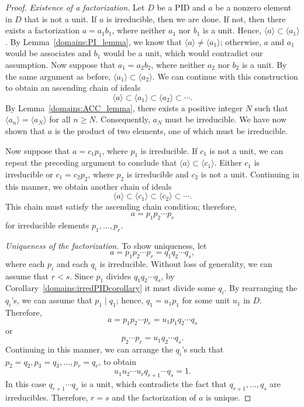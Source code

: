 \begin{proof}
\emph{Existence of a factorization.}
Let $D$ be a PID and $a$ be a nonzero element in $D$ that is not a
unit. If $a$ is irreducible, then we are done. If not, then there
exists a factorization $a = a_1 b_1$, where neither $a_1$ nor $b_1$ is
a unit. Hence, $\langle a \rangle \subset \langle a_1 \rangle$. By
Lemma~\ref{domains:PI_lemma}, we know that $\langle a \rangle \neq \langle a_1 \rangle$;
otherwise, $a$ and $a_1$ would be associates and $b_1$ would be a unit,
which would contradict our assumption. Now suppose that $a_1 =  a_2
b_2$, where neither $a_2$ nor $b_2$ is a unit. By the same argument as
before, $\langle a_1 \rangle \subset \langle a_2 \rangle$.  We can
continue with this construction to obtain an ascending chain of ideals
\[
\langle a \rangle \subset \langle a_1 \rangle \subset \langle a_2
\rangle \subset \cdots.
\]
By Lemma~\ref{domains:ACC_lemma}, there exists a positive integer $N$ such that
$\langle a_n \rangle = \langle a_N \rangle$ for all $n \geq N$. 
Consequently, $a_N$ must be irreducible. We have now shown that $a$ is
the product of two elements, one of which must be irreducible.  



Now suppose that $a = c_1 p_1$, where $p_1$ is irreducible. If $c_1$
is not a unit, we can repeat the preceding argument to conclude that
$\langle a \rangle \subset \langle c_1 \rangle$. Either $c_1$ is
irreducible or $c_1 = c_2 p_2$, where $p_2$ is irreducible and $c_2$
is not a unit.  Continuing in this manner, we obtain another chain of
ideals
\[
\langle a \rangle \subset \langle c_1 \rangle \subset \langle c_2
\rangle \subset \cdots.	   
\]
This chain must satisfy the ascending chain condition; therefore, 
\[
a = p_1 p_2 \cdots p_r
\]
for irreducible elements $p_1, \ldots, p_r$.


\emph{Uniqueness of the factorization.}
To show uniqueness, let
\[
a= p_1 p_2 \cdots p_r = q_1 q_2 \cdots q_s,
\]
where each $p_i$ and each $q_i$ is irreducible.  Without loss of
generality, we can assume that $r < s$. Since $p_1$ divides $q_1 q_2
\cdots q_s$, by Corollary~\ref{domains:irredPIDcorollary} it must divide some $q_i$. By
rearranging the $q_i$'s, we can assume that $p_1 \mid q_1$; hence,
$q_1 = u_1 p_1$ for some unit $u_1$ in $D$. Therefore,
\[
a = p_1 p_2 \cdots p_r = u_1 p_1 q_2 \cdots q_s
\]
or 
\[
p_2 \cdots p_r = u_1 q_2 \cdots q_s.
\]
Continuing in this manner, we can arrange the $q_i$'s such that $p_2
= q_2, p_3 = q_3, \ldots, p_r = q_r$, to obtain
\[
u_1 u_2 \cdots u_r q_{r+1} \cdots q_s = 1.
\]
In this case $q_{r+1} \cdots q_s$ is a unit, which contradicts the
fact that $q_{r+1}, \ldots, q_s$ are irreducibles. Therefore, $r=s$
and the factorization of $a$ is unique.
\end{proof}

